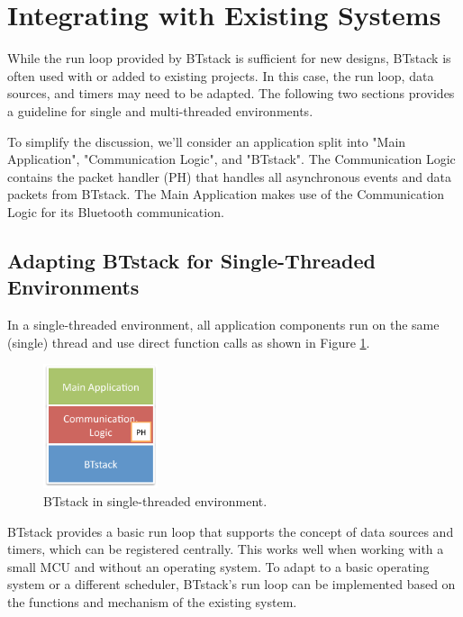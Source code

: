 \documentclass[a4paper,titlepage,oneside,12pt]{amsart} %
\begin{document}
\section{Integrating with Existing Systems}

While the run loop provided by BTstack is sufficient for new designs, BTstack is often used with or added to existing projects. In this case, the run loop, data sources, and timers may need to be adapted. The following two sections provides a guideline for single and multi-threaded environments.

To simplify the discussion, we'll consider an application split into "Main \mbox{Application}", "Communication Logic", and "BTstack". The Communication Logic contains the packet handler (PH) that handles all asynchronous events and data packets from BTstack. The Main Application makes use of the Communication Logic for its Bluetooth communication.

\subsection{Adapting BTstack for Single-Threaded Environments}
\label{section:singlethreading}

In a single-threaded environment, all application components run on the same (single) thread and use direct function calls as shown in Figure \ref{fig:BTstackSingle}.

\begin{figure}[htbp] %
   \centering
   \includegraphics[width=0.3\textwidth]{picts/singlethreading-btstack.pdf} 
   \caption{BTstack in single-threaded environment. }
   \label{fig:BTstackSingle}
\end{figure}

BTstack provides a basic run loop that supports the concept of data sources and timers, which can be registered centrally. This works well when working with a small MCU and without an operating system.
To adapt to a basic operating system or a different scheduler, BTstack's run loop can be implemented based on the functions and mechanism of the existing system. 
\end{document}
